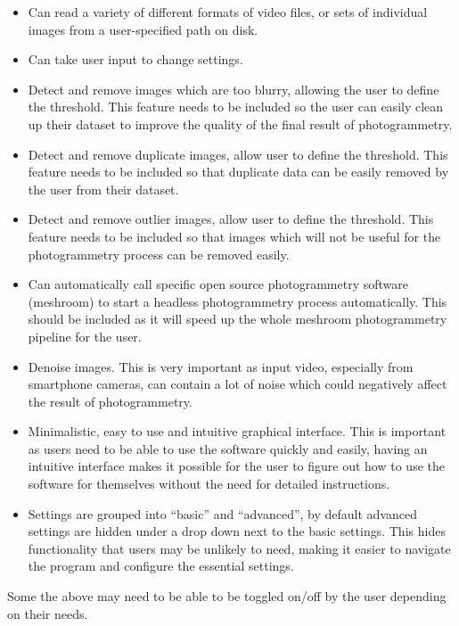 \documentclass[11pt]{report}
\begin{document}
\begin{itemize}
\item Can read a variety of different formats of video files, or sets of individual images from a user-specified path on disk.
\item Can take user input to change settings.
\item Detect and remove images which are too blurry, allowing the user to define the threshold. This feature needs to be included so the user can easily clean up their dataset to improve the quality of the final result of photogrammetry.
\item Detect and remove duplicate images, allow user to define the threshold. This feature needs to be included so that duplicate data can be easily removed by the user from their dataset.
\item Detect and remove outlier images, allow user to define the threshold. This feature needs to be included so that images which will not be useful for the photogrammetry process can be removed easily.
\item Can automatically call specific open source photogrammetry software (meshroom) to start a headless photogrammetry process automatically. This should be included as it will speed up the whole meshroom photogrammetry pipeline for the user.
\item Denoise images. This is very important as input video, especially from smartphone cameras, can contain a lot of noise which could negatively affect the result of photogrammetry.
\item Minimalistic, easy to use and intuitive graphical interface. This is important as users need to be able to use the software quickly and easily, having an intuitive interface makes it possible for the user to figure out how to use the software for themselves without the need for detailed instructions.
\item Settings are grouped into ``basic'' and ``advanced'', by default advanced settings are hidden under a drop down next to the basic settings. This hides functionality that users may be unlikely to need, making it easier to navigate the program and configure the essential settings.
\end{itemize}
Some the above may need to be able to be toggled on/off by the user depending on their needs.
\end{document}
